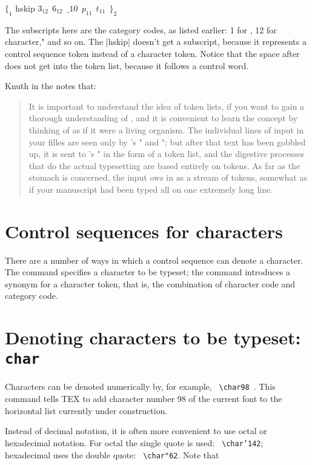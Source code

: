 $ \{_{1}$ hskip $3_{12}~~6_{12}~~\_{10}~~p_{11}~~t_{11}~~\}_2 $

\medskip
The subscripts here are the category codes, as listed earlier: 1 for ,
12 for  character," and so on. The |hskip| doesn't get a subscript, because it
represents a control sequence token instead of a character token. Notice that the space
after  does not get into the token list, because it follows a control word.

Knuth in the \texbook notes that:

\begin{quote}
It is important to understand the idea of token lists, if you want to gain a
thorough understanding of \tex, and it is convenient to learn the concept by
thinking of \tex as if it were a living organism. The individual lines of input in your
filles are seen only by \tex's " and "; but after that text has been gobbled
up, it is sent to \tex's " in the form of a token list, and the digestive processes
that do the actual typesetting are based entirely on tokens. As far as the stomach is
concerned, the input 
ows in as a stream of tokens, somewhat as if your \tex manuscript
had been typed all on one extremely long line.
\end{quote}

\section{Control sequences for characters}

There are a number of ways in which a control sequence can denote a character. The  command
specifies a character to be typeset; the  command introduces a synonym for a character
token, that is, the combination of character code and category code.

\section{Denoting characters to be typeset: \texttt{char}}

Characters can be denoted numerically by, for example, \verb+ \char98 +. This command tells TEX to add
character number 98 of the current font to the horizontal list currently under construction.

Instead of decimal notation, it is often more convenient to use octal or hexadecimal notation. For
octal the single quote is used: \verb+ \char’142+; hexadecimal uses the double quote: \verb+ \char"62+. Note that

